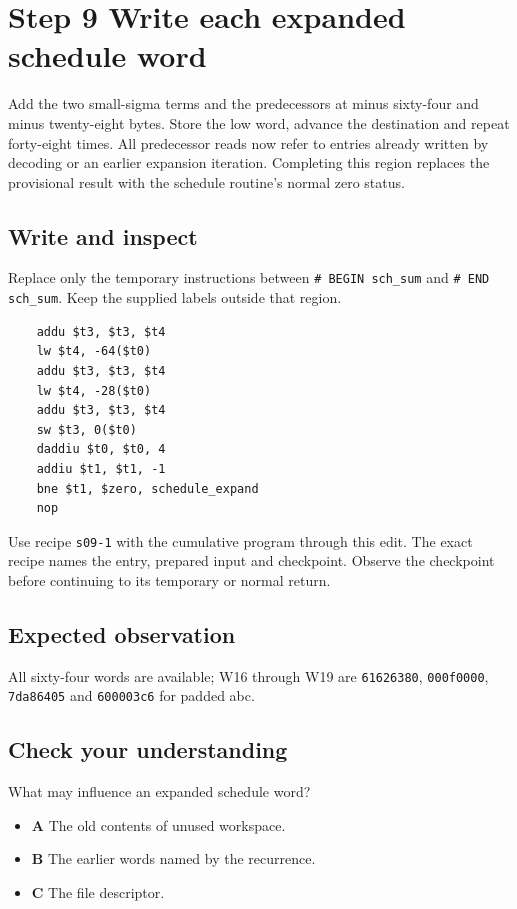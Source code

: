 \section{Step 9 Write each expanded schedule word}\label{sha-s09}

Add the two small-sigma terms and the predecessors at minus sixty-four and minus twenty-eight bytes. Store the low word, advance the destination and repeat forty-eight times. All predecessor reads now refer to entries already written by decoding or an earlier expansion iteration. Completing this region replaces the provisional result with the schedule routine's normal zero status.

\subsection{Write and inspect}
Replace only the temporary instructions between \texttt{\# BEGIN sch\_sum} and \texttt{\# END sch\_sum}. Keep the supplied labels outside that region.

\begin{verbatim}
    addu $t3, $t3, $t4
    lw $t4, -64($t0)
    addu $t3, $t3, $t4
    lw $t4, -28($t0)
    addu $t3, $t3, $t4
    sw $t3, 0($t0)
    daddiu $t0, $t0, 4
    addiu $t1, $t1, -1
    bne $t1, $zero, schedule_expand
    nop
\end{verbatim}

Use recipe \texttt{s09-1} with the cumulative program through this edit. The exact recipe names the entry, prepared input and checkpoint. Observe the checkpoint before continuing to its temporary or normal return.

\subsection{Expected observation}
All sixty-four words are available; W16 through W19 are \texttt{61626380}, \texttt{000f0000}, \texttt{7da86405} and \texttt{600003c6} for padded abc.

\subsection{Check your understanding}
What may influence an expanded schedule word?

\begin{itemize}
  \item \textbf{A} The old contents of unused workspace.
  \item \textbf{B} The earlier words named by the recurrence.
  \item \textbf{C} The file descriptor.
\end{itemize}
